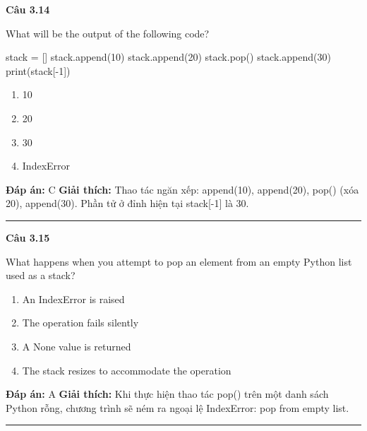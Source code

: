 \documentclass[11pt,a4paper]{article}
\newenvironment{question}[1]{%
  \par\vspace{1em}\noindent\textbf{\large Câu #1}\par\vspace{0.4em}
}{%
  \par\vspace{1em}\hrule\vspace{0.6em}
}
\newenvironment{choices}{%
  \begin{enumerate}[label=\textbf{\Alph*.},leftmargin=2.2em,itemsep=2pt,topsep=3pt]
}{%
  \end{enumerate}
}
\newcommand{\choice}{\item}
\newenvironment{codebox}{%
  \begin{tcolorbox}[colback=gray!8!white,colframe=gray!50!black,arc=1.5mm,boxrule=0.6pt,left=3mm,right=3mm,top=2.5mm,bottom=2.5mm]
  \ttfamily\small
}{%
  \end{tcolorbox}
}
\begin{document}
\begin{question}{3.14}
What will be the output of the following code?
\begin{codebox}
stack = []
stack.append(10)
stack.append(20)
stack.pop()
stack.append(30)
print(stack[-1])
\end{codebox}
\begin{choices}
\choice 10
\choice 20
\choice 30
\choice IndexError
\end{choices}
\textbf{Đáp án:} C
\textbf{Giải thích:} Thao tác ngăn xếp: append(10), append(20), pop() (xóa 20), append(30). Phần tử ở đỉnh hiện tại stack[-1] là 30.
\end{question}

\begin{question}{3.15}
What happens when you attempt to pop an element from an empty Python list used as a stack?
\begin{choices}
\choice An IndexError is raised
\choice The operation fails silently
\choice A None value is returned
\choice The stack resizes to accommodate the operation
\end{choices}
\textbf{Đáp án:} A
\textbf{Giải thích:} Khi thực hiện thao tác pop() trên một danh sách Python rỗng, chương trình sẽ ném ra ngoại lệ IndexError: pop from empty list.
\end{question}
\end{document}

